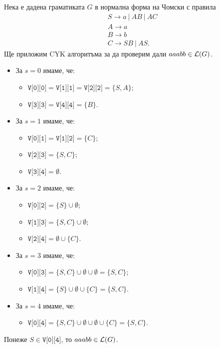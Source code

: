 \begin{extra2}
  
\begin{example}
  Нека е дадена граматиката $G$ в нормална форма на Чомски с правила 
  \begin{align*}
    & S\rightarrow a\ |\ AB\ |\ AC\\
    & A\rightarrow a\\
    & B\rightarrow b\\
    & C\rightarrow SB\ |\ AS.
  \end{align*}
  Ще приложим CYK алгоритъма за да проверим дали $aaabb \in \mathcal{L}(G)$.
  
  \begin{itemize}
  \item 
    За $s = 0$ имаме, че:
    \begin{itemize}
    \item 
      $\texttt{V[0][0]} = \texttt{V[1][1]} = \texttt{V[2][2]} = \{S,A\}$;
    \item
      $\texttt{V[3][3]} = \texttt{V[4][4]} = \{B\}$.
    \end{itemize}
  \item
    За $s = 1$ имаме, че:
    \begin{itemize}
    \item
      $\texttt{V[0][1]} = \texttt{V[1][2]} = \{C\}$;
    \item
      $\texttt{V[2][3]} = \{S,C\}$;
    \item
      $\texttt{V[3][4]} = \emptyset$.
    \end{itemize}
  \item
    За $s = 2$ имаме, че:
    \begin{itemize}
    \item
      $\texttt{V[0][2]} = \{S\} \cup \emptyset$;
    \item
      $\texttt{V[1][3]} = \{S,C\} \cup \emptyset$;
    \item
      $\texttt{V[2][4]} = \emptyset \cup \{C\}$.
    \end{itemize}
  \item
    За $s = 3$ имаме, че:
    \begin{itemize}
    \item
      $\texttt{V[0][3]} = \{S,C\} \cup \emptyset \cup \emptyset = \{S,C\}$;
    \item
      $\texttt{V[1][4]} = \{S\} \cup \emptyset \cup \{C\} = \{S,C\}$.
    \end{itemize}
  \item
    За $s = 4$ имаме, че:
    \begin{itemize}
    \item 
      $\texttt{V[0][4]} = \{S,C\} \cup \emptyset \cup \emptyset \cup \{C\}= \{S,C\}$.
    \end{itemize}
  \end{itemize}
  Понеже $S \in \texttt{V[0][4]}$, то $aaabb \in \mathcal{L}(G)$.
\end{example}
\end{extra2}


